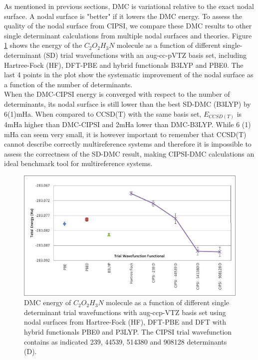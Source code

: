 As mentioned in previous sections, DMC is variational relative to the exact nodal surface. A nodal surface is "better" if it lowers the DMC energy. To assess the quality of the nodal surface from CIPSI, we compare these DMC results to other single determinant calculations from multiple nodal surfaces and theories. Figure \ref{fig:CIPSI-DMC} shows the energy of the $C_2O_2H_3N$ molecule as a function of different single-determinant (SD) trial wavefunctions with an aug-cc-pVTZ basis set, including Hartree-Fock (HF), DFT-PBE and hybrid functionals B3LYP and PBE0. The last 4 points in the plot show the systematic improvement of the nodal surface as a function of the number of determinants. \\

When the DMC-CIPSI energy is converged with respect to the number of determinants, its nodal surface is still lower than the best SD-DMC (B3LYP) by 6(1)mHa. When compared to CCSD(T) with the same basis set, $E_{CCSD(T)}$ is 4mHa higher than DMC-CIPSI and 2mHa lower than DMC-B3LYP. While 6 (1) mHa can seem very small, it is however important to remember that CCSD(T) cannot describe correctly multireference systems and therefore it is impossible to assess the correctness of the SD-DMC result, making CIPSI-DMC calculations an ideal benchmark tool for multireference systems.  

\begin{figure}
\begin{center}
\includegraphics[trim = 2mm 2mm 2mm 2mm, clip,width=0.9
\columnwidth]{figures/DMC-Multidet.jpg}
\end{center}
\caption{DMC energy of $C_2O_2H_3N$ molecule as a function of different single determinant trial wavefunctions with aug-ccp-VTZ basis set using nodal surfaces from Hartree-Fock (HF), DFT-PBE and DFT with hybrid functionals PBE0 and P3LYP. The CIPSI trial wavefunction contains as indicated 239, 44539, 514380 and 908128 determinants (D). 
\label{fig:CIPSI-DMC}
}
\end{figure}
